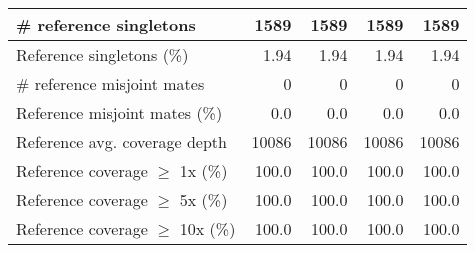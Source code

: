 \documentclass[12pt,a4paper]{article}
\begin{document}
\begin{table}[ht]
\begin{center}
\begin{tabular}{|l*{4}{|r}|}
\# reference singletons & 1589 & 1589 & 1589 & 1589 \\ \hline
Reference singletons (\%) & 1.94 & 1.94 & 1.94 & 1.94 \\ \hline
\# reference misjoint mates & 0 & 0 & 0 & 0 \\ \hline
Reference misjoint mates (\%) & 0.0 & 0.0 & 0.0 & 0.0 \\ \hline
Reference avg. coverage depth & 10086 & 10086 & 10086 & 10086 \\ \hline
Reference coverage $\geq$ 1x (\%) & 100.0 & 100.0 & 100.0 & 100.0 \\ \hline
Reference coverage $\geq$ 5x (\%) & 100.0 & 100.0 & 100.0 & 100.0 \\ \hline
Reference coverage $\geq$ 10x (\%) & 100.0 & 100.0 & 100.0 & 100.0 \\ \hline
\end{tabular}
\end{center}
\end{table}
\end{document}
